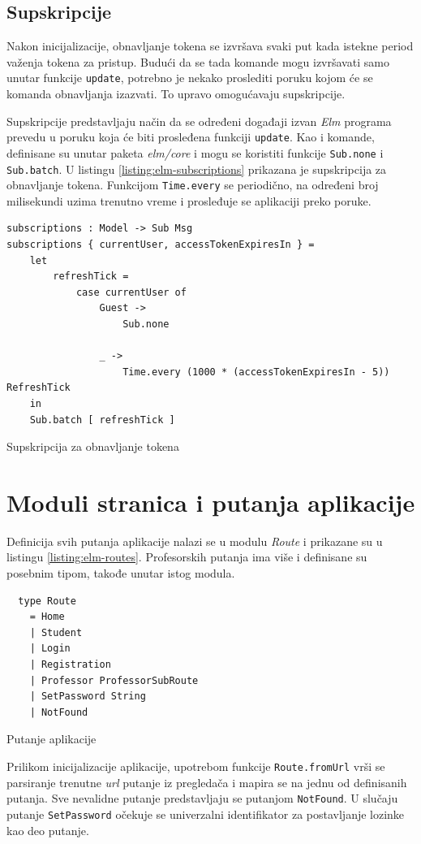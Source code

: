 \documentclass[12pt,oneside]{memoir}
\begin{document}
\subsection{Supskripcije}
Nakon inicijalizacije, obnavljanje tokena se izvršava svaki put kada istekne period važenja tokena za pristup.
Budući da se tada komande mogu izvršavati samo unutar funkcije \texttt{update}, potrebno je nekako proslediti poruku
kojom će se komanda obnavljanja izazvati. To upravo omogućavaju supskripcije.

Supskripcije predstavljaju način da se određeni događaji izvan \emph{Elm} programa prevedu u
poruku koja će biti prosleđena funkciji \texttt{update}. Kao i komande, definisane su unutar paketa \emph{elm/core}
i mogu se koristiti funkcije \texttt{Sub.none} i \texttt{Sub.batch}.
U listingu \ref{listing:elm-subscriptions} prikazana je supskripcija za obnavljanje
tokena. Funkcijom \texttt{Time.every} se periodično, na određeni broj milisekundi uzima trenutno vreme i prosleđuje se
aplikaciji preko poruke. 
\begin{listing}[h]
\begin{verbatim}
subscriptions : Model -> Sub Msg
subscriptions { currentUser, accessTokenExpiresIn } =
    let
        refreshTick =
            case currentUser of
                Guest ->
                    Sub.none

                _ ->
                    Time.every (1000 * (accessTokenExpiresIn - 5)) RefreshTick
    in
    Sub.batch [ refreshTick ]
\end{verbatim}
\caption{Supskripcija za obnavljanje tokena}
\label{listing:elm-subscriptions}
\end{listing}

\section{Moduli stranica i putanja aplikacije}
Definicija svih putanja aplikacije nalazi se u modulu \emph{Route} i prikazane su u listingu \ref{listing:elm-routes}.
Profesorskih putanja ima više i definisane su posebnim tipom, takođe unutar istog modula.
\begin{listing}[h]
\begin{verbatim}
  type Route
    = Home
    | Student
    | Login
    | Registration
    | Professor ProfessorSubRoute
    | SetPassword String
    | NotFound
\end{verbatim}
\caption{Putanje aplikacije}
\label{listing:elm-routes}
\end{listing}
Prilikom inicijalizacije aplikacije, upotrebom funkcije \texttt{Route.fromUrl} vrši se parsiranje trenutne
\emph{url} putanje iz pregledača i mapira se na jednu od definisanih putanja. Sve nevalidne putanje 
predstavljaju se putanjom \texttt{NotFound}. U slučaju putanje \texttt{SetPassword} očekuje se univerzalni
identifikator za postavljanje lozinke kao deo putanje.
\end{document}
